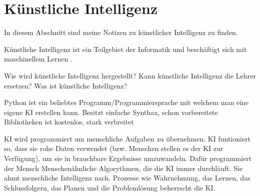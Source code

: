 \section{Künstliche Intelligenz}
\label{sec:ai}

In diesem Abschnitt sind meine Notizen zu künstlicher Intelligenz zu finden.

Künstliche Intelligenz ist ein Teilgebiet der Informatik und beschäftigt sich mit maschinellem Lernen \citep{ai-wikipedia}.




Wie wird künstliche Intelligenz hergestellt?
Kann künstliche Intelligenz die Lehrer ersetzen?
Was ist künstliche Intelligenz?



Python ist ein beliebtes Programm/Programmiersprache mit welchem man eine eigene KI erstellen kann.
Besitzt einfache Synthax, schon vorbereitete Bibliotheken
ist kostenlos, stark verbreitet

KI wird programmiert um menschliche Aufgaben zu übernehmen.
KI funtioniert so, dass sie rohe Daten verwendet (bzw. Menschen stellen es der KI zur Verfügung), um sie in brauchbare Ergebnisse umzuwandeln.
Dafür programmiert der Mensch Menschenähnliche Algorythmen, die die KI immer durchläuft. Sie ahmt menschliche Intelligenz nach.
Prozesse wie Wahrnehmung, das Lernen, das Schlussfolgern, das Planen und die Problemlösung beherrscht die KI.
